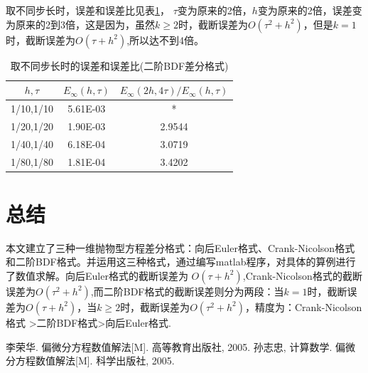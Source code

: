 \documentclass[withoutpreface,bwprint]{cumcmthesis} %
\begin{document}
取不同步长时，误差和误差比见表\ref{tab:6}， $\tau$变为原来的2倍，$h$变为原来的2倍，误差变为原来的2到3倍，这是因为，虽然$ k \geq 2 $时，截断误差为$O(\tau^2+h^2)$，但是$ k=1 $时，截断误差为$O(\tau+h^2)$,所以达不到4倍。

\begin{table}[htbp]
	\centering
	\caption{取不同步长时的误差和误差比(二阶BDF差分格式)}
	\begin{tabular}{ccc}
		\toprule[1.5pt]
		$h,\tau$   & $E_{\infty}(h,\tau)$ & $E_{\infty}(2h,4\tau)/E_{\infty}(h,\tau)$ \\
		\midrule[1pt]
	    1/10,1/10 & 5.61E-03 & \multicolumn{1}{c}{*} \\
		1/20,1/20 & 1.90E-03 & 2.9544  \\
		1/40,1/40 & 6.18E-04 & 3.0719  \\
		1/80,1/80 & 1.81E-04 & 3.4202  \\
		\bottomrule[1.5pt]
	\end{tabular}%
	\label{tab:6}%
\end{table}%

\section{总结}
本文建立了三种一维抛物型方程差分格式：向后Euler格式、Crank-Nicolson格式和二阶BDF格式。并运用这三种格式，通过编写matlab程序，对具体的算例进行了数值求解。向后Euler格式的截断误差为  $ O(\tau +h^2) $,Crank-Nicolson格式的截断误差为$ O(\tau^2 +h^2) $,而二阶BDF格式的截断误差则分为两段：当$ k=1 $时，截断误差为$O(\tau+h^2)$，当$ k \geq 2 $时，截断误差为$O(\tau^2+h^2)$，精度为：Crank-Nicolson格式 >二阶BDF格式>向后Euler格式.

\newpage
\begin{thebibliography}{9}%
	李荣华. 偏微分方程数值解法[M]. 高等教育出版社, 2005.
	孙志忠, 计算数学. 偏微分方程数值解法[M]. 科学出版社, 2005.
\end{thebibliography}
\end{document}
